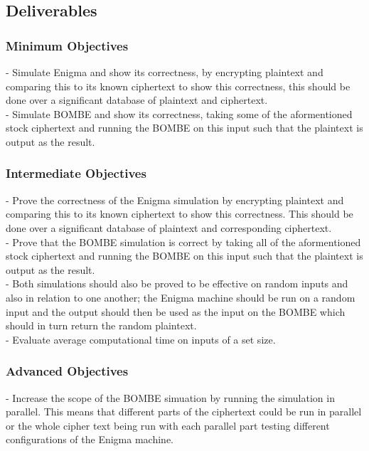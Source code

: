 \documentclass[12pt,a4paper]{article}
\begin{document}
\subsection{Deliverables}

\subsubsection{Minimum Objectives}

- Simulate Enigma and show its correctness, by encrypting plaintext and comparing this to its known ciphertext to show this correctness, this should be done over a significant database of plaintext and ciphertext.\\
- Simulate BOMBE and show its correctness, taking some of the aformentioned stock ciphertext and running the BOMBE on this input such that the plaintext is output as the result.

\subsubsection{Intermediate Objectives}

- Prove the correctness of the Enigma simulation by encrypting plaintext and comparing this to its known ciphertext to show this correctness. This should be done over a significant database of plaintext and corresponding  ciphertext.\\
- Prove that the BOMBE simulation is correct by taking all of the aformentioned stock ciphertext and running the BOMBE on this input such that the plaintext is output as the result.\\
- Both simulations should also be proved to be effective on random inputs and also in relation to one another; the Enigma machine should be run on a random input and the output should then be used as the input on the BOMBE which should in turn return the random plaintext.\\
- Evaluate average computational time on inputs of a set size.

\subsubsection{Advanced Objectives}

- Increase the scope of the BOMBE simuation by running the simulation in parallel. This means that different parts of the ciphertext could be run in parallel or the whole cipher text being run with each parallel part testing different configurations of the Enigma machine.
\end{document}
